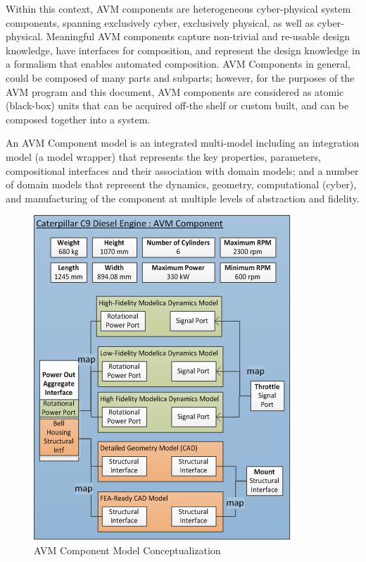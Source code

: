 Within this context, AVM components are heterogeneous cyber-physical system components, spanning exclusively cyber, exclusively physical, as well as cyber-physical. Meaningful AVM components capture non-trivial and re-usable design knowledge, have interfaces for composition, and represent the design knowledge in a formalism that enables automated composition. AVM Components in general, could be composed of many parts and subparts; however, for the purposes of the AVM program and this document, AVM components are considered as atomic (black-box) units that can be acquired off-the shelf or custom built, and can be composed together into a system. 

An AVM Component model is an integrated multi-model including an integration model (a model wrapper) that represents the key properties, parameters, compositional interfaces and their association with domain models; and a number of domain models that represent the dynamics, geometry, computational (cyber), and manufacturing of the component at multiple levels of abstraction and fidelity. 


\begin{figure}
\includegraphics{ComponentConcept}
\caption{AVM Component Model Conceptualization}
\label{Intro_Component}
\end{figure}

